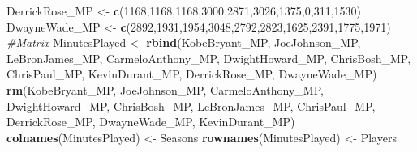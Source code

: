 \documentclass[
]{article}
\newenvironment{Shaded}{\begin{snugshade}}{\end{snugshade}}
\newcommand{\CommentTok}[1]{\textcolor[rgb]{0.56,0.35,0.01}{\textit{#1}}}
\newcommand{\DecValTok}[1]{\textcolor[rgb]{0.00,0.00,0.81}{#1}}
\newcommand{\KeywordTok}[1]{\textcolor[rgb]{0.13,0.29,0.53}{\textbf{#1}}}
\newcommand{\NormalTok}[1]{#1}
\newcommand{\StringTok}[1]{\textcolor[rgb]{0.31,0.60,0.02}{#1}}
\begin{document}
\begin{Shaded}
\begin{Highlighting}[]
\NormalTok{DerrickRose_MP <-}\StringTok{ }\KeywordTok{c}\NormalTok{(}\DecValTok{1168}\NormalTok{,}\DecValTok{1168}\NormalTok{,}\DecValTok{1168}\NormalTok{,}\DecValTok{3000}\NormalTok{,}\DecValTok{2871}\NormalTok{,}\DecValTok{3026}\NormalTok{,}\DecValTok{1375}\NormalTok{,}\DecValTok{0}\NormalTok{,}\DecValTok{311}\NormalTok{,}\DecValTok{1530}\NormalTok{)}
\NormalTok{DwayneWade_MP <-}\StringTok{ }\KeywordTok{c}\NormalTok{(}\DecValTok{2892}\NormalTok{,}\DecValTok{1931}\NormalTok{,}\DecValTok{1954}\NormalTok{,}\DecValTok{3048}\NormalTok{,}\DecValTok{2792}\NormalTok{,}\DecValTok{2823}\NormalTok{,}\DecValTok{1625}\NormalTok{,}\DecValTok{2391}\NormalTok{,}\DecValTok{1775}\NormalTok{,}\DecValTok{1971}\NormalTok{)}
\CommentTok{#Matrix}
\NormalTok{MinutesPlayed <-}\StringTok{ }\KeywordTok{rbind}\NormalTok{(KobeBryant_MP, JoeJohnson_MP, LeBronJames_MP, CarmeloAnthony_MP, DwightHoward_MP, ChrisBosh_MP, ChrisPaul_MP, KevinDurant_MP, DerrickRose_MP, DwayneWade_MP)}
\KeywordTok{rm}\NormalTok{(KobeBryant_MP, JoeJohnson_MP, CarmeloAnthony_MP, DwightHoward_MP, ChrisBosh_MP, LeBronJames_MP, ChrisPaul_MP, DerrickRose_MP, DwayneWade_MP, KevinDurant_MP)}
\KeywordTok{colnames}\NormalTok{(MinutesPlayed) <-}\StringTok{ }\NormalTok{Seasons}
\KeywordTok{rownames}\NormalTok{(MinutesPlayed) <-}\StringTok{ }\NormalTok{Players}


\end{Highlighting}
\end{Shaded}
\end{document}
